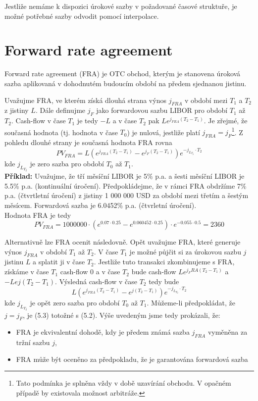 \documentclass[a4paper]{book}
\begin{document}
Jestliže nemáme k dispozici úrokové sazby v požadované časové struktuře, je možné potřebné sazby odvodit pomocí interpolace.

\section{Forward rate agreement}

Forward rate agreement (FRA) je OTC obchod, kterým je stanovena úroková sazba aplikovaná v dohodnutém budoucím období na předem sjednanou jistinu.

Uvažujme FRA, ve kterém získá dlouhá strana výnos $j_{FRA}$ v období mezi $T_1$ a $T_2$ z jistiny $L$. Dále definujme $j_F$ jako forwardovou sazbu LIBOR pro období $T_1$ až $T_2$. Cash-flow v čase $T_1$ je tedy $-L$ a v čase $T_2$ pak $Le^{j_{FRA}(T_2 - T_1)}$. Je zřejmé, že současná hodnota (tj. hodnota v čase $T_0$) je nulová, jestliže platí $j_{FRA} = j_F$\footnote{Tato podmínka je splněna vždy v době uzavírání obchodu. V opačném případě by existovala možnost arbitráže.}. Z pohledu dlouhé strany je současná hodnota FRA rovna
\begin{equation}
PV_{FRA} = L(e^{j_{FRA}(T_2 - T_1)} - e^{j_F(T_2 - T_1)})e^{-j_{L_{T_2}} \cdot T_2}
\end{equation}
kde $j_{L_{T_2}}$ je zero sazba pro období $T_0$ až $T_1$.\\

\noindent \textbf{Příklad:} Uvažujme, že tří měsíční LIBOR je 5\% p.a. a šesti měsíční LIBOR je 5.5\% p.a. (kontinuální úročení). Předpokládejme, že v rámci FRA obdržíme 7\% p.a. (čtvrtletní úročení) z jistiny 1 000 000 USD za období mezi třetím a šestým měsícem. Forwardová sazba je 6.0452\% p.a. (čtvrletní úročení).\\

Hodnota FRA je tedy
\begin{equation*}
PV_{FRA} = 1 000 000 \cdot (e^{0.07 \cdot 0.25} - e^{0.060452 \cdot 0.25}) \cdot e^{-0.055 \cdot 0.5} = 2 360
\end{equation*}

Alternativně lze FRA ocenit následovně. Opět uvažujme FRA, které generuje výnos $j_{FRA}$ v období $T_1$ až $T_2$. V čase $T_1$ je možné půjčit si za úrokovou sazbu $j$ jistinu $L$ a splatit ji v čase $T_2$. Jestliže tuto transakci zkombinujeme s FRA, získáme v čase $T_1$ cash-flow 0 a v čase $T_2$ bude cash-flow $Le^{j_FRA(T_2 - T_1)}$ a $-Le{j(T_2 - T_1)}$. Výsledná cash-flow v čase $T_2$ tedy bude
\begin{equation}
L(e^{j_{FRA}(T_2 - T_1)} - e^{j(T_2 - T_1)})e^{-j_{L_{T_2}} \cdot T_2}
\end{equation}
kde $j_{L_{T_2}}$ je opět zero sazba pro období $T_0$ až $T_1$. Můžeme-li předpokládat, že $j = j_F$, je (5.3) totožné s (5.2).
Výše uvedeným jsme tedy prokázali, že:
\begin{itemize}
  \item FRA je ekvivalentní dohodě, kdy je předem známá sazba $j_{FRA}$ vyměněna za tržní sazbu $j$,
  \item FRA může být oceněno za předpokladu, že je garantována forwardová sazba
\end{itemize}
  
\end{document}
